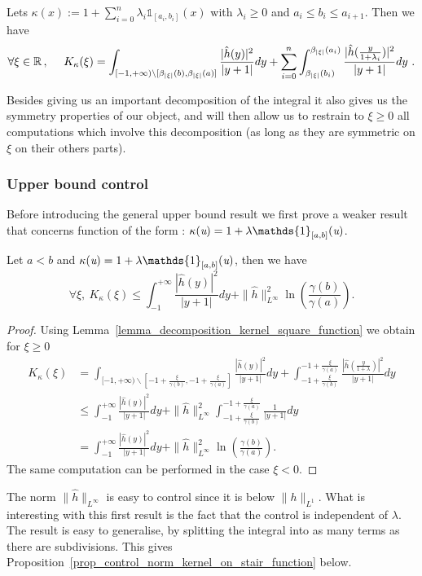 \begin{lemma}\label{lemma_decomposition_kernel_square_function_general}
	Lets $\kappa(x) := 1 + \sum_{i=0}^n \lambda_i \mathds{1}_{[a_i,b_i]}(x)$ with $\lambda_i\geqslant 0$ and $a_i\leqslant b_i \leqslant a_{i+1}$. Then we have
	\begin{equation}
		\forall \xi\in\R\, ,\quad \ K_\kappa(\xi) = \int_{[-1,+\infty)\backslash [\beta_{|\xi|}(b),\beta_{|\xi|}(a)]}\frac{|\hat{h}(y)|^2}{|y+1|}dy + \sum_{i=0}^n\int_{\beta_{|\xi|}(b_i)}^{\beta_{|\xi|}(a_i)}\frac{|\hat{h}(\tfrac{y}{1+\lambda_i})|^2}{|y+1|}dy\ .
	\end{equation}
\end{lemma}
Besides giving us an important decomposition of the integral it also gives us the symmetry properties of our object, and will then allow us to restrain to $\xi\geqslant0$ all computations which involve this decomposition (as long as they are symmetric on $\xi$ on their others parts).

\subsubsection{Upper bound control}

Before introducing the general upper bound result we first prove a weaker result that concerns function of the form : $ \kappa(\u) = 1 + \lambda\mathds{1}_{[a,b]}(\u)$.


\begin{prop}\label{prop_control_kernel_of_square_function}
	Let $a<b$ and $\kappa(\u)= 1 + \lambda \mathds{1}_{[a,b]}(\u)$, then we have
	\begin{equation}
		\forall \xi, \ K_\kappa (\xi) \leqslant \int_{-1}^{+\infty}\frac{|\hat{h}(y)|^2}{|y+1|}dy + \|\hat{h}\|_{L^\infty}^2\ln\left(\frac{\gamma(b)}{\gamma(a)}\right).
	\end{equation}
\end{prop}
\begin{proof}
	Using Lemma~\ref{lemma_decomposition_kernel_square_function} we obtain for $\xi\geqslant0$
	\begin{align}
		K_\kappa(\xi) &= \int_{[-1,+\infty)\backslash [-1+\frac{\xi}{\gamma(b)},-1+\frac{\xi}{\gamma(a)}]}\frac{|\hat{h}(y)|^2}{|y+1|}dy + \int_{-1+\frac{\xi}{\gamma(b)}}^{-1+\frac{\xi}{\gamma(a)}}\frac{|\hat{h}(\tfrac{y}{1+\lambda})|^2}{|y+1|}dy \\
		& \leqslant \int_{-1}^{+\infty}\frac{|\hat{h}(y)|^2}{|y+1|}dy + \|\hat{h}\|_{L^\infty}^2\int_{-1+\frac{\xi}{\gamma(b)}}^{-1+\frac{\xi}{\gamma(a)}}\frac{1}{|y+1|}dy \\
		&= \int_{-1}^{+\infty}\frac{|\hat{h}(y)|^2}{|y+1|}dy + \|\hat{h}\|_{L^\infty}^2\ln\left(\frac{\gamma(b)}{\gamma(a)}\right).
	\end{align}
	The same computation can be performed in the case $\xi<0$.
\end{proof}
The norm $\|\hat{h}\|_{L^\infty}$ is easy to control since it is below $\|h\|_{L^1}$. What is interesting with this first result is the fact that the control is independent of $\lambda$. The result is easy to generalise, by splitting the integral into as many terms as there are subdivisions. This gives Proposition~\ref{prop_control_norm_kernel_on_stair_function} below.

